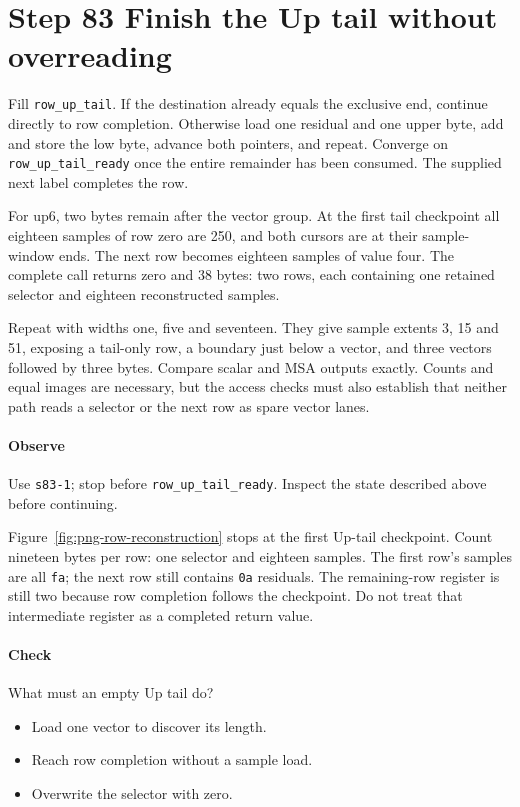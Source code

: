 \section{Step 83 Finish the Up tail without overreading}
Fill \texttt{row\_up\_tail}. If the destination already equals the exclusive end, continue directly to row completion. Otherwise load one residual and one upper byte, add and store the low byte, advance both pointers, and repeat. Converge on \texttt{row\_up\_tail\_ready} once the entire remainder has been consumed. The supplied next label completes the row.

For up6, two bytes remain after the vector group. At the first tail checkpoint all eighteen samples of row zero are 250, and both cursors are at their sample-window ends. The next row becomes eighteen samples of value four. The complete call returns zero and 38 bytes: two rows, each containing one retained selector and eighteen reconstructed samples.

Repeat with widths one, five and seventeen. They give sample extents 3, 15 and 51, exposing a tail-only row, a boundary just below a vector, and three vectors followed by three bytes. Compare scalar and MSA outputs exactly. Counts and equal images are necessary, but the access checks must also establish that neither path reads a selector or the next row as spare vector lanes.

\paragraph{Observe} Use \texttt{s83-1}; stop before \texttt{row\_up\_tail\_ready}. Inspect the state described above before continuing.

Figure~\ref{fig:png-row-reconstruction} stops at the first Up-tail checkpoint.
Count nineteen bytes per row: one selector and eighteen samples. The first row's
samples are all \texttt{fa}; the next row still contains \texttt{0a} residuals.
The remaining-row register is still two because row completion follows the
checkpoint. Do not treat that intermediate register as a completed return value.


\clearpage

\paragraph{Check} What must an empty Up tail do?
\begin{itemize}
  \item[A.] Load one vector to discover its length.
  \item[B.] Reach row completion without a sample load.
  \item[C.] Overwrite the selector with zero.
\end{itemize}
